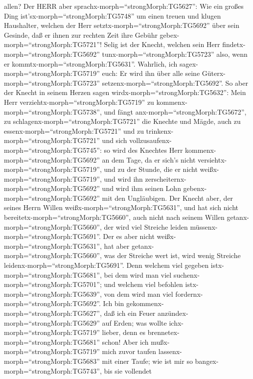 allen?  Der HERR aber sprachx-morph=``strongMorph:TG5627'':
Wie ein großes Ding ist'sx-morph=``strongMorph:TG5748'' um einen treuen
und klugen Haushalter, welchen der Herr
setztx-morph=``strongMorph:TG5692'' über sein Gesinde, daß er ihnen zur
rechten Zeit ihre Gebühr gebex-morph=``strongMorph:TG5721''!
 Selig ist der Knecht, welchen sein Herr
findetx-morph=``strongMorph:TG5692'' tunx-morph=``strongMorph:TG5723''
also, wenn er kommtx-morph=``strongMorph:TG5631''. 
Wahrlich, ich sagex-morph=``strongMorph:TG5719'' euch: Er wird ihn über
alle seine Güterx-morph=``strongMorph:TG5723''
setzenx-morph=``strongMorph:TG5692''.  So aber der Knecht
in seinem Herzen sagen wirdx-morph=``strongMorph:TG5632'': Mein Herr
verziehtx-morph=``strongMorph:TG5719'' zu
kommenx-morph=``strongMorph:TG5738'', und fängt
anx-morph=``strongMorph:TG5672'', zu
schlagenx-morph=``strongMorph:TG5721'' die Knechte und Mägde, auch zu
essenx-morph=``strongMorph:TG5721'' und zu
trinkenx-morph=``strongMorph:TG5721'' und sich
vollzusaufenx-morph=``strongMorph:TG5745'':  so wird des
Knechtes Herr kommenx-morph=``strongMorph:TG5692'' an dem Tage, da er
sich's nicht versiehtx-morph=``strongMorph:TG5719'', und zu der Stunde,
die er nicht weißx-morph=``strongMorph:TG5719'', und wird ihn
zerscheiternx-morph=``strongMorph:TG5692'' und wird ihm seinen Lohn
gebenx-morph=``strongMorph:TG5692'' mit den Ungläubigen. 
Der Knecht aber, der seines Herrn Willen
weißx-morph=``strongMorph:TG5631'', und hat sich nicht
bereitetx-morph=``strongMorph:TG5660'', auch nicht nach seinem Willen
getanx-morph=``strongMorph:TG5660'', der wird viel Streiche leiden
müssenx-morph=``strongMorph:TG5691''.  Der es aber nicht
weißx-morph=``strongMorph:TG5631'', hat aber
getanx-morph=``strongMorph:TG5660'', was der Streiche wert ist, wird
wenig Streiche leidenx-morph=``strongMorph:TG5691''. Denn welchem viel
gegeben istx-morph=``strongMorph:TG5681'', bei dem wird man viel
suchenx-morph=``strongMorph:TG5701''; und welchem viel befohlen
istx-morph=``strongMorph:TG5639'', von dem wird man viel
fordernx-morph=``strongMorph:TG5692''.  Ich bin
gekommenx-morph=``strongMorph:TG5627'', daß ich ein Feuer
anzündex-morph=``strongMorph:TG5629'' auf Erden; was wollte
ichx-morph=``strongMorph:TG5719'' lieber, denn es
brennetex-morph=``strongMorph:TG5681'' schon!  Aber ich
mußx-morph=``strongMorph:TG5719'' mich zuvor taufen
lassenx-morph=``strongMorph:TG5683'' mit einer Taufe; wie ist mir so
bangex-morph=``strongMorph:TG5743'', bis sie vollendet
